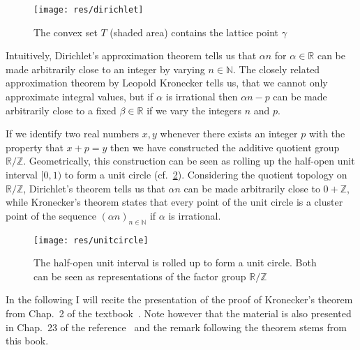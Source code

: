 \begin{figure}
  \begin{center}
    \texttt{[image: res/dirichlet]}
    \caption{The convex set \(T\) (shaded area) contains the lattice point
             \(γ\)}
    \label{fig:dirichlet}
  \end{center}
\end{figure}

Intuitively, Dirichlet's approximation theorem tells us that \(α n\) for \(α ∈
ℝ\) can be made arbitrarily close to an integer by varying \(n ∈ ℕ\). The
closely related approximation theorem by Leopold Kronecker tells us, that we
cannot only approximate integral values, but if \(α\) is irrational then \(α n -
p\) can be made arbitrarily close to a fixed \(β ∈ ℝ\) if we vary the integers
\(n\) and \(p\).

If we identify two real numbers \(x, y\) whenever there exists an integer \(p\)
with the property that \(x + p = y\) then we have constructed the additive
quotient group \(ℝ / ℤ\). Geometrically, this construction can be seen as
rolling up the half-open unit interval \([0, 1)\) to form a unit circle
(cf.~\cref{fig:unitcircle}). Considering the quotient topology on \(ℝ / ℤ\),
Dirichlet's theorem tells us that \(α n\) can be made arbitrarily close to \(0
+ ℤ\), while Kronecker's theorem states that every point of the unit circle is a
cluster point of the sequence \((α n)_{n ∈ ℕ}\) if \(α\) is irrational.

\begin{figure}
  \begin{center}
    \texttt{[image: res/unitcircle]}
    \caption{The half-open unit interval is rolled up to form a unit circle.
             Both can be seen as representations of the factor group \(ℝ/ℤ\)}%
    \label{fig:unitcircle}
  \end{center}
\end{figure}

In the following I will recite the presentation of the proof of Kronecker's
theorem from Chap.~2 of the textbook~\cite{Hlawka1991}. Note however that the
material is also presented in Chap.~23 of the reference~\cite{Hardy1975} and the
remark following the theorem stems from this book.


